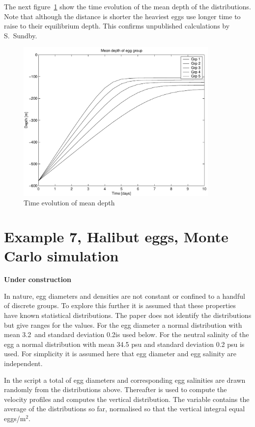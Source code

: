 The next figure~\ref{fig:ex6g} show the time evolution of the mean
depth of the distributions. Note that although the distance is shorter
the heaviest eggs use longer time to raise to their equilibrium
depth. This confirms unpublished calculations by S.~Sundby.

\begin{figure}[!htb]
\begin{center}
\includegraphics[height=8cm]{ex6g}
\end{center}
\caption{Time evolution of mean depth}
\label{fig:ex6g}
\end{figure}



\section{Example 7, Halibut eggs, Monte Carlo simulation}
{\bfseries Under construction}

In nature, egg diameters and densities are not constant or confined to
a handful of discrete groups. To explore this further it is assumed
that these properties have known statistical distributions.  The paper
\citep{haug84} does not identify the distributions but give ranges for
the values.  For the egg diameter a normal distribution with mean
3.2\mm\ and standard deviation 0.2\mm is used below. For the neutral
salinity of the egg a normal distribution with mean 34.5 psu and
standard deviation 0.2 psu is used. For simplicity it is assumed here
that egg diameter and egg salinity are independent.

In the script  a total of  egg diameters and 
corresponding egg salinities are
drawn randomly from the distributions above. Thereafter
 is used to compute the velocity profiles and
 computes the vertical distribution. The variable
 contains the average of the distributions so far,
normalised so that the vertical integral equal  eggs/m$^2$.

